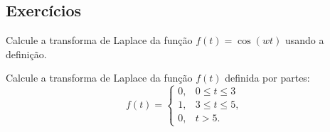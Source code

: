 \subsection*{Exercícios}
\begin{exer}Calcule a transforma de Laplace da função $f(t)=\cos(wt)$ usando a definição. 
\end{exer}
\begin{exer}Calcule a transforma de Laplace da função $f(t)$ definida por partes:
\begin{equation}
f(t)=\left\{\begin{array}{ll} 0, &0\leq t\leq 3\\ 1, & 3\leq t\leq 5,\\0,&t>5.
\end{array}\right.
\end{equation}
\end{exer}
